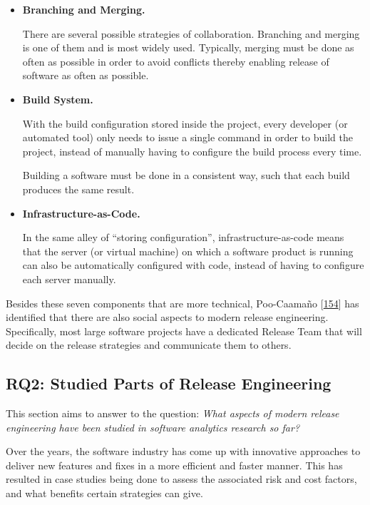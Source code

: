 \documentclass[]{book}
\begin{document}
\begin{itemize}
\item
  \textbf{Branching and Merging.}

  There are several possible strategies of collaboration. Branching and
  merging is one of them and is most widely used. Typically, merging
  must be done as often as possible in order to avoid conflicts thereby
  enabling release of software as often as possible.
\item
  \textbf{Build System.}

  With the build configuration stored inside the project, every
  developer (or automated tool) only needs to issue a single command in
  order to build the project, instead of manually having to configure
  the build process every time.

  Building a software must be done in a consistent way, such that each
  build produces the same result.
\item
  \textbf{Infrastructure-as-Code.}

  In the same alley of ``storing configuration'', infrastructure-as-code
  means that the server (or virtual machine) on which a software product
  is running can also be automatically configured with code, instead of
  having to configure each server manually.
\end{itemize}

Besides these seven components that are more technical, Poo-Caamaño
{[}\protect\hyperlink{ref-poo-caamano2016a}{154}{]} has identified that
there are also social aspects to modern release engineering.
Specifically, most large software projects have a dedicated Release Team
that will decide on the release strategies and communicate them to
others.

\subsection{RQ2: Studied Parts of Release
Engineering}\label{rq2-studied-parts-of-release-engineering}

This section aims to answer to the question: \emph{What aspects of
modern release engineering have been studied in software analytics
research so far?}

Over the years, the software industry has come up with innovative
approaches to deliver new features and fixes in a more efficient and
faster manner. This has resulted in case studies being done to assess
the associated risk and cost factors, and what benefits certain
strategies can give.
\end{document}
